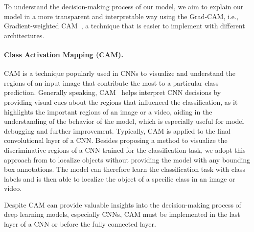     


To understand the decision-making process of our model, 
we aim to explain our model in a more transparent and interpretable way using the Grad-CAM, 
i.e., Gradient-weighted CAM~\cite{SelvarajuCDVPB17}, 
a technique that is easier to implement with different architectures. 

\paragraph{Class Activation Mapping (CAM).}
CAM is a technique popularly used in CNNs to visualize and understand the regions of an input image that contribute the most to a particular class prediction. 
Generally speaking, 
CAM~\cite{ZhouKLOT16} helps interpret CNN decisions by providing visual cues about the regions that influenced the classification, 
as it highlights the important regions of an image or a video, 
aiding in the understanding of the behavior of the model, 
which is especially useful for model debugging and further improvement. 
Typically,
CAM is applied to the final convolutional layer of a CNN. 
Besides proposing a method to visualize the discriminative regions of a CNN trained for the classification task, 
we adopt this approach from \citet{ZhouKLOT16} to localize objects without providing the model with any bounding box annotations. 
The model can therefore learn the classification task with class labels and is then able to localize the object of a specific class in an image or video. 

Despite CAM can provide valuable insights into the decision-making process of deep learning models, especially CNNs, 
CAM must be implemented in the last layer of a CNN or before the fully connected layer.

